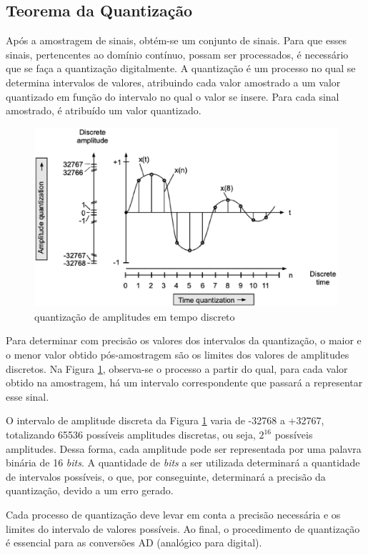 \subsection{Teorema da Quantização}

Após a amostragem de sinais, obtém-se um conjunto de sinais. Para que esses sinais, pertencentes ao domínio contínuo, possam ser processados, é necessário que se faça a quantização digitalmente. A quantização é um processo no qual se determina intervalos de valores, atribuindo cada valor amostrado a um valor quantizado em função do intervalo no qual o valor se insere. Para cada sinal amostrado, é atribuído um valor quantizado.

\begin{figure}[h]
	\centering
    \includegraphics[scale=0.4]{figuras/fig04.eps}
	\caption{quantização de amplitudes em tempo discreto \cite{oppenheim2010sinais}}
	\label{fig04}
\end{figure}

Para determinar com precisão os valores dos intervalos da quantização, o maior e o menor valor obtido pós-amostragem são os limites dos valores de amplitudes discretos. Na Figura \ref{fig04}, observa-se o processo a partir do qual, para cada valor obtido na amostragem, há um intervalo correspondente que passará a representar esse sinal.
\par O intervalo de amplitude discreta da Figura \ref{fig04} varia de -32768 a +32767, totalizando 65536 possíveis amplitudes discretas, ou seja, $2^{16}$ possíveis amplitudes. Dessa forma, cada amplitude pode ser representada por uma palavra binária de 16 \textit{bits}. A quantidade de \textit{bits} a ser utilizada determinará a quantidade de intervalos possíveis, o que, por conseguinte, determinará a precisão da quantização, devido a um erro gerado.
\par Cada processo de quantização deve levar em conta a precisão necessária e os limites do intervalo de valores possíveis. Ao final, o procedimento de quantização é essencial para as conversões AD (analógico para digital).

